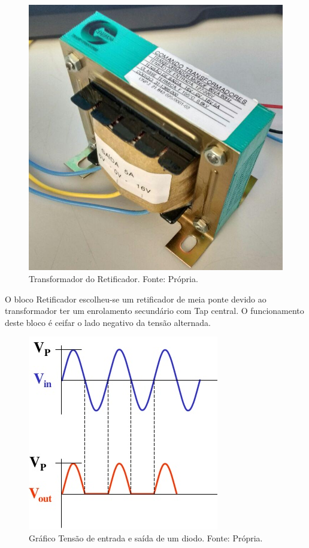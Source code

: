         \begin{figure}[!htb]
            \centering
            \includegraphics[scale= 0.3]{figuras/Transformador.png}
            \caption{Transformador do Retificador. Fonte: Própria.}
            \label{transformador-retificador}
        \end{figure}	
        
        O bloco Retificador escolheu-se um retificador de meia ponte devido ao 							transformador ter um enrolamento secundário com Tap central. O funcionamento 					deste bloco é ceifar o lado negativo da tensão alternada. 			

        \begin{figure}[!htb]
            \centering
            \includegraphics[scale= 0.5]{figuras/Retificador.png}
            \caption{Gráfico Tensão de entrada e saída de um diodo. Fonte: Própria.}
            \label{retificador}
        \end{figure}		
        
